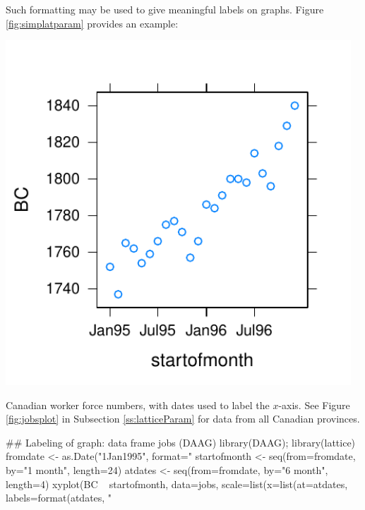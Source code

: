 Such formatting may be used to give meaningful labels on graphs.
Figure \ref{fig:simplatparam} provides an example:
\begin{marginfigure}[2cm]
\begin{Schunk}


\centerline{\includegraphics[width=0.97\textwidth]{figs/04-date-labs-1} }

\end{Schunk}
 \caption{Canadian worker force numbers, with dates used to label the
   $x$-axis. See Figure \ref{fig:jobsplot} in
   Subsection \ref{ss:latticeParam} for data from all Canadian
 provinces.}\label{fig:simplatparam}
\end{marginfigure}
\begin{Schunk}
\begin{Sinput}
## Labeling of graph: data frame jobs (DAAG)
library(DAAG); library(lattice)
fromdate <- as.Date("1Jan1995", format="%
startofmonth <- seq(from=fromdate, by="1 month",
                    length=24)
atdates <- seq(from=fromdate, by="6 month",
               length=4)
xyplot(BC ~ startofmonth, data=jobs,
       scale=list(x=list(at=atdates,
                         labels=format(atdates,
                                       "%
\end{Sinput}
\end{Schunk}

